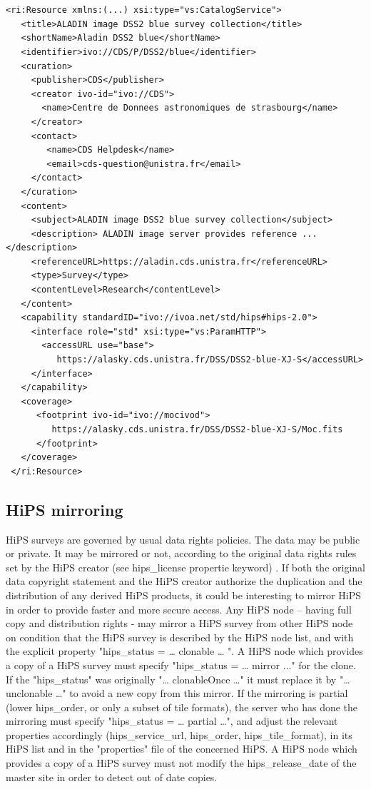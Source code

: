 \documentclass[11pt,a4paper]{ivoa}
\begin{document}
{\footnotesize
\begin{verbatim}


<ri:Resource xmlns:(...) xsi:type="vs:CatalogService">
   <title>ALADIN image DSS2 blue survey collection</title>
   <shortName>Aladin DSS2 blue</shortName>
   <identifier>ivo://CDS/P/DSS2/blue</identifier>
   <curation>
     <publisher>CDS</publisher>
     <creator ivo-id="ivo://CDS">
       <name>Centre de Donnees astronomiques de strasbourg</name>
     </creator>
     <contact>
        <name>CDS Helpdesk</name>
        <email>cds-question@unistra.fr</email>
     </contact>
   </curation>
   <content>
     <subject>ALADIN image DSS2 blue survey collection</subject>
     <description> ALADIN image server provides reference ... </description>
     <referenceURL>https://aladin.cds.unistra.fr</referenceURL>
     <type>Survey</type>
     <contentLevel>Research</contentLevel>
   </content>
   <capability standardID="ivo://ivoa.net/std/hips#hips-2.0">
     <interface role="std" xsi:type="vs:ParamHTTP">
       <accessURL use="base">
          https://alasky.cds.unistra.fr/DSS/DSS2-blue-XJ-S</accessURL>
     </interface>
   </capability>
   <coverage>
      <footprint ivo-id="ivo://mocivod">
         https://alasky.cds.unistra.fr/DSS/DSS2-blue-XJ-S/Moc.fits
      </footprint>
   </coverage>
 </ri:Resource>
\end{verbatim}
}

\subsection{HiPS mirroring}

HiPS surveys are governed by usual data rights policies. The data may be public or private. It may be mirrored or not, according to the original data rights rules set by the HiPS creator (see hips\_license propertie keyword)  .
If both the original data copyright statement and the HiPS creator authorize the duplication and the distribution of any derived HiPS products, it could be interesting to mirror HiPS in order to provide faster and more secure access.
Any HiPS node – having full copy and distribution rights - may mirror a HiPS survey from other HiPS node on condition that the HiPS survey is described by the HiPS node list, and with the explicit property "hips\_status = … clonable … ".
A HiPS node which provides a copy of a HiPS survey must specify "hips\_status = … mirror ..." for the clone. If the "hips\_status" was originally "… clonableOnce …" it must replace it by "… unclonable …" to avoid a new copy from this mirror. If the mirroring is partial (lower hips\_order, or only a subset of tile formats), the server who has done the mirroring must specify "hips\_status = … partial …", and adjust the relevant properties accordingly (hips\_service\_url, hips\_order, hips\_tile\_format), in its HiPS list and in the "properties" file of the concerned HiPS.
A HiPS node which provides a copy of a HiPS survey must not modify the hips\_release\_date of the master site in order to detect out of date copies.
\end{document}
